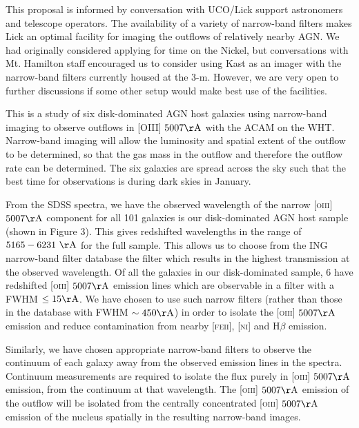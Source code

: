\documentclass[12pt]{article}
\begin{document}
\vspace{0.25em}


\vspace{0.25em}
This proposal is informed by conversation with UCO/Lick support astronomers and telescope operators. The availability of a variety of narrow-band filters makes Lick an optimal facility for imaging the outflows of relatively nearby AGN. We had originally considered applying for time on the Nickel, but conversations with Mt. Hamilton staff encouraged us to consider using Kast as an imager with the narrow-band filters currently housed at the 3-m. However, we are very open to further discussions if some other setup would make best use of the facilities.
\vspace{0.25em}

This is a study of six disk-dominated AGN host galaxies using narrow-band imaging to observe outflows in \textsc{[OIII]} $5007\rm{\AA}$ with the ACAM on the WHT. Narrow-band imaging will allow the luminosity and spatial extent of the outflow to be determined, so that the gas mass in the outflow and therefore the outflow rate can be determined. The six galaxies are spread across the sky such that the best time for observations is during dark skies in January.
\vspace{0.25em}

From the SDSS spectra, we have the observed  wavelength of the narrow \textsc{[oiii]} $5007\rm{\AA}$ component for all 101 galaxies is our disk-dominated AGN host sample (shown in Figure 3). This gives redshifted wavelengths in the range of $5165-6231~\rm{\AA}$ for the full sample. This allows us to choose from the ING narrow-band filter database the filter which results in the highest transmission at the observed wavelength. Of all the galaxies in our disk-dominated sample, 6 have redshifted \textsc{[oiii]} $5007\rm{\AA}$ emission lines which are observable in a filter with a FWHM $\leq15\rm{\AA}$. We have chosen to use such narrow filters (rather than those in the database with FWHM $\sim450\rm{\AA}$) in order to isolate the \textsc{[oiii]} $5007\rm{\AA}$ emission and reduce contamination from nearby \textsc{[feii]}, \textsc{[ni]} and H$\beta$ emission. 
\vspace{0.25em}

Similarly, we have chosen appropriate narrow-band filters to observe the continuum of each galaxy away from the observed emission lines in the spectra. Continuum measurements are required to isolate the flux purely in \textsc{[oiii]} $5007\rm{\AA}$ emission, from the continuum at that wavelength. The \textsc{[oiii]} $5007\rm{\AA}$ emission of the outflow will be isolated from the centrally concentrated \textsc{[oiii]} $5007\rm{\AA}$ emission of the nucleus spatially in the resulting narrow-band images. 
\vspace{0.25em}
\end{document}
